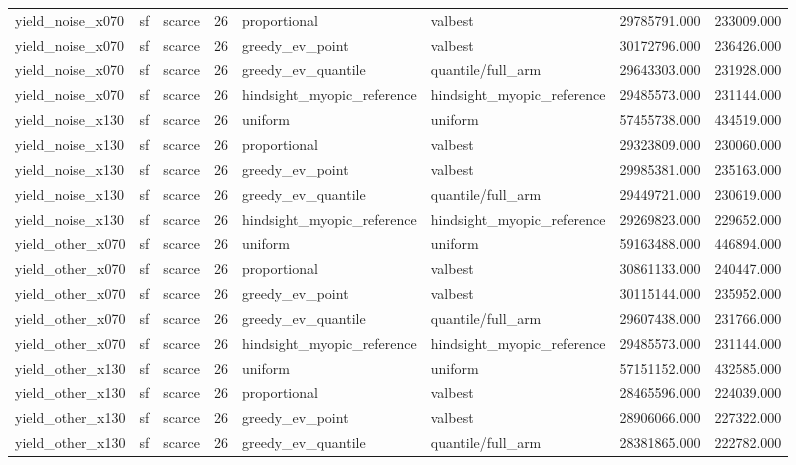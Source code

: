 \begin{tabular}{lllrllrr}
yield\_noise\_x070 & sf & scarce & 26 & proportional & valbest & 29785791.000 & 233009.000 \\
yield\_noise\_x070 & sf & scarce & 26 & greedy\_ev\_point & valbest & 30172796.000 & 236426.000 \\
yield\_noise\_x070 & sf & scarce & 26 & greedy\_ev\_quantile & quantile/full\_arm & 29643303.000 & 231928.000 \\
yield\_noise\_x070 & sf & scarce & 26 & hindsight\_myopic\_reference & hindsight\_myopic\_reference & 29485573.000 & 231144.000 \\
yield\_noise\_x130 & sf & scarce & 26 & uniform & uniform & 57455738.000 & 434519.000 \\
yield\_noise\_x130 & sf & scarce & 26 & proportional & valbest & 29323809.000 & 230060.000 \\
yield\_noise\_x130 & sf & scarce & 26 & greedy\_ev\_point & valbest & 29985381.000 & 235163.000 \\
yield\_noise\_x130 & sf & scarce & 26 & greedy\_ev\_quantile & quantile/full\_arm & 29449721.000 & 230619.000 \\
yield\_noise\_x130 & sf & scarce & 26 & hindsight\_myopic\_reference & hindsight\_myopic\_reference & 29269823.000 & 229652.000 \\
yield\_other\_x070 & sf & scarce & 26 & uniform & uniform & 59163488.000 & 446894.000 \\
yield\_other\_x070 & sf & scarce & 26 & proportional & valbest & 30861133.000 & 240447.000 \\
yield\_other\_x070 & sf & scarce & 26 & greedy\_ev\_point & valbest & 30115144.000 & 235952.000 \\
yield\_other\_x070 & sf & scarce & 26 & greedy\_ev\_quantile & quantile/full\_arm & 29607438.000 & 231766.000 \\
yield\_other\_x070 & sf & scarce & 26 & hindsight\_myopic\_reference & hindsight\_myopic\_reference & 29485573.000 & 231144.000 \\
yield\_other\_x130 & sf & scarce & 26 & uniform & uniform & 57151152.000 & 432585.000 \\
yield\_other\_x130 & sf & scarce & 26 & proportional & valbest & 28465596.000 & 224039.000 \\
yield\_other\_x130 & sf & scarce & 26 & greedy\_ev\_point & valbest & 28906066.000 & 227322.000 \\
yield\_other\_x130 & sf & scarce & 26 & greedy\_ev\_quantile & quantile/full\_arm & 28381865.000 & 222782.000 \\

\end{tabular}
